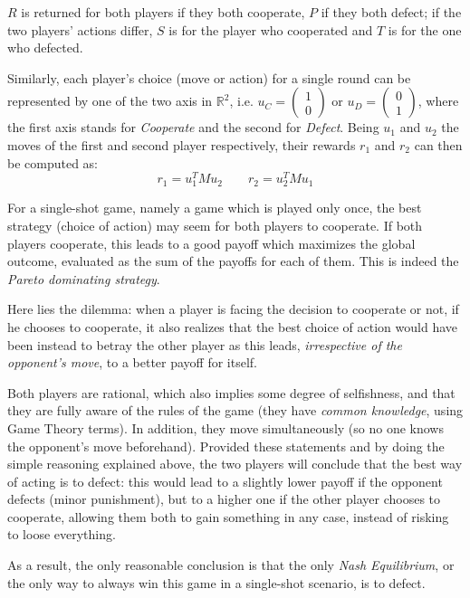 \documentclass[journal,10pt,twoside]{IEEEtran}
\begin{document}
$R$ is returned for both players if they both cooperate, $P$ if they both defect; if the two players' actions differ, $S$ is for the player who cooperated and $T$ is for the one who defected.

Similarly, each player's choice (move or action) for a single round can be represented by one of the two axis in $\mathbb{R}^2$, i.e. $u_C=\begin{pmatrix} 1 \\ 0 \end{pmatrix}$ or $u_D=\begin{pmatrix} 0 \\ 1 \end{pmatrix}$, where the first axis stands for \textit{Cooperate} and the second for \textit{Defect}. Being $u_1$ and $u_2$ the moves of the first and second player respectively, their rewards $r_1$ and $r_2$ can then be computed as:
$$
r_1 = u_1^T M u_2
\quad
\quad
r_2 = u_2^T M u_1
$$

For a single-shot game, namely a game which is played only once, the best strategy (choice of action) may seem for both players to cooperate. If both players cooperate, this leads to a good payoff which maximizes the global outcome, evaluated as the sum of the payoffs for each of them. This is indeed the \textit{Pareto dominating strategy}.

Here lies the dilemma: when a player is facing the decision to cooperate or not, if he chooses to cooperate, it also realizes that the best choice of action would have been instead to betray the other player as this leads, \textit{irrespective of the opponent's move}, to a better payoff for itself.

Both players are rational, which also implies some degree of selfishness, and that they are fully aware of the rules of the game (they have \textit{common knowledge}, using Game Theory terms). In addition, they move simultaneously (so no one knows the opponent's move beforehand). Provided these statements and by doing the simple reasoning explained above, the two players will conclude that the best way of acting is to defect: this would lead to a slightly lower payoff if the opponent defects (minor punishment), but to a higher one if the other player chooses to cooperate, allowing them both to gain something in any case, instead of risking to loose everything.

As a result, the only reasonable conclusion is that the only \textit{Nash Equilibrium}, or the only way to always win this game in a single-shot scenario, is to defect.
\end{document}
